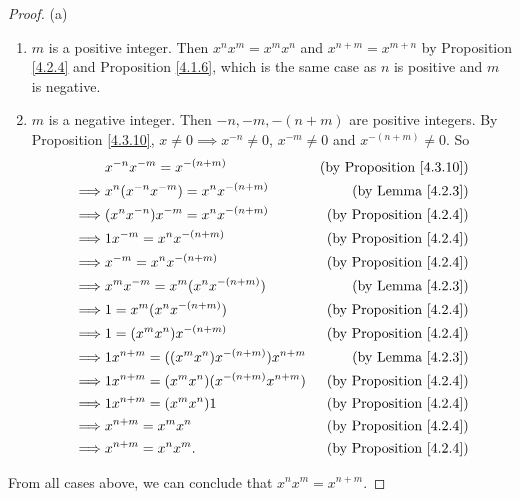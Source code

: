 \begin{proof}{(a)}
\begin{enumerate}[label=(\Roman*)]
\begin{enumerate}[label=(\roman*)]
                  \item \(m\) is a positive integer.
                        Then \(x^n x^m = x^m x^n\) and \(x^{n + m} = x^{m + n}\) by Proposition \ref{4.2.4} and Proposition \ref{4.1.6}, which is the same case as \(n\) is positive and \(m\) is negative.
                  \item \(m\) is a negative integer.
                        Then \(-n, -m, -(n + m)\) are positive integers.
                        By Proposition \ref{4.3.10}, \(x \neq 0 \implies x^{-n} \neq 0\), \(x^{-m} \neq 0\) and \(x^{-(n + m)} \neq 0\).
                        So
                        \begin{align*}
                                     & x^{-n} x^{-m} = x^{-(n + m)}                   & \text{(by Proposition \ref{4.3.10})} \\
                            \implies & x^n (x^{-n} x^{-m}) = x^n x^{-(n + m)}         & \text{(by Lemma \ref{4.2.3})}        \\
                            \implies & (x^n x^{-n}) x^{-m} = x^n x^{-(n + m)}         & \text{(by Proposition \ref{4.2.4})}  \\
                            \implies & 1x^{-m} = x^n x^{-(n + m)}                     & \text{(by Proposition \ref{4.2.4})}  \\
                            \implies & x^{-m} = x^n x^{-(n + m)}                      & \text{(by Proposition \ref{4.2.4})}  \\
                            \implies & x^m x^{-m} = x^m (x^n x^{-(n + m)})            & \text{(by Lemma \ref{4.2.3})}        \\
                            \implies & 1 = x^m (x^n x^{-(n + m)})                     & \text{(by Proposition \ref{4.2.4})}  \\
                            \implies & 1 = (x^m x^n) x^{-(n + m)}                     & \text{(by Proposition \ref{4.2.4})}  \\
                            \implies & 1x^{n + m} = ((x^m x^n) x^{-(n + m)})x^{n + m} & \text{(by Lemma \ref{4.2.3})}        \\
                            \implies & 1x^{n + m} = (x^m x^n)(x^{-(n + m)} x^{n + m}) & \text{(by Proposition \ref{4.2.4})}  \\
                            \implies & 1x^{n + m} = (x^m x^n)1                        & \text{(by Proposition \ref{4.2.4})}  \\
                            \implies & x^{n + m} = x^m x^n                            & \text{(by Proposition \ref{4.2.4})}  \\
                            \implies & x^{n + m} = x^n x^m.                           & \text{(by Proposition \ref{4.2.4})}
                        \end{align*}
              \end{enumerate}
    \end{enumerate}
    From all cases above, we can conclude that \(x^n x^m = x^{n + m}\).


\end{proof}
